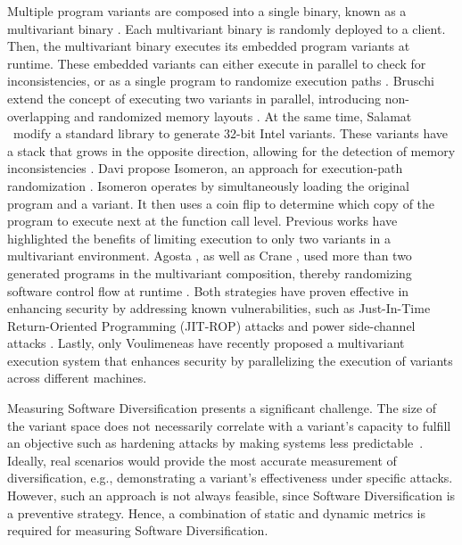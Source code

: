 \begin{strategy}
    Multiple program variants are composed into a single binary, known as a multivariant binary \cite{cox06}. 
    Each multivariant binary is randomly deployed to a client.
    Then, the multivariant binary executes its embedded program variants at runtime. 
    These embedded variants can either execute in parallel to check for inconsistencies, or as a single program to randomize execution paths \cite{bhatkar03}. 
    Bruschi \etal extend the concept of executing two variants in parallel, introducing non-overlapping and randomized memory layouts \cite{bruschi2007diversified}. 
    At the same time, Salamat \etal~modify a standard library to generate 32-bit Intel variants. 
    These variants have a stack that grows in the opposite direction, allowing for the detection of memory inconsistencies \cite{salamat2007stopping}. 
    Davi \etal propose Isomeron, an approach for execution-path randomization \cite{davi2015isomeron}. 
    Isomeron operates by simultaneously loading the original program and a variant. 
    It then uses a coin flip to determine which copy of the program to execute next at the function call level. 
    Previous works have highlighted the benefits of limiting execution to only two variants in a multivariant environment. 
    Agosta \etal, as well as Crane \etal, used more than two generated programs in the multivariant composition, thereby randomizing software control flow at runtime \cite{agosta2015meet, crane2015thwarting}. 
    Both strategies have proven effective in enhancing security by addressing known vulnerabilities, such as Just-In-Time Return-Oriented Programming (JIT-ROP) attacks \cite{jackson2011compiler} and power side-channel attacks \cite{amarilli2011can}. 
    Lastly, only Voulimeneas \etal \cite{voulimeneas2021dmvx} have recently proposed a multivariant execution system that enhances security by parallelizing the execution of variants across different machines.
\end{strategy}


\label{measuring_diversification}
Measuring Software Diversification presents a significant challenge. 
The size of the variant space does not necessarily correlate with a variant's capacity to fulfill an objective such as hardening attacks by making systems less predictable~\cite{cohen1993operating}. 
Ideally, real scenarios would provide the most accurate measurement of diversification, e.g., demonstrating a variant's effectiveness under specific attacks. 
However, such an approach is not always feasible, since Software Diversification is a preventive strategy. 
Hence, a combination of static and dynamic metrics is required for measuring Software Diversification.

